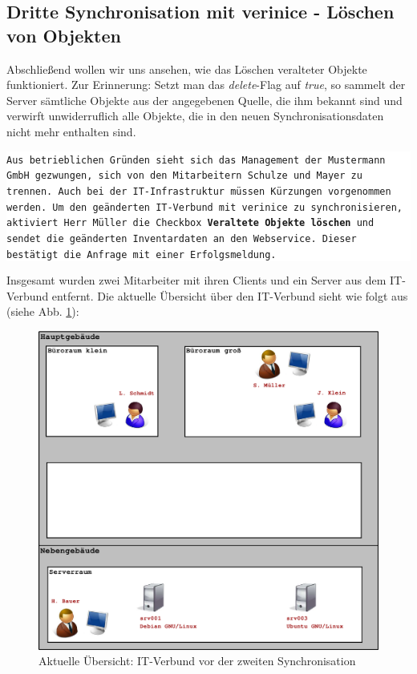 \documentclass[a4paper,10pt]{book}
\begin{document}
\subsection{ Dritte Synchronisation mit verinice - Löschen von Objekten}
Abschließend wollen wir uns ansehen, wie das Löschen veralteter Objekte funktioniert. Zur Erinnerung: Setzt man das
\textit{delete}-Flag auf \textit{true}, so sammelt der Server sämtliche Objekte aus der angegebenen Quelle, die ihm
bekannt sind und verwirft unwiderruflich alle Objekte, die in den neuen Synchronisationsdaten nicht mehr enthalten sind.
\newline
\newline
\colorbox{white}{\parbox{\textwidth}{
{\tt Aus betrieblichen Gründen sieht sich das Management der Mustermann GmbH gezwungen, sich von den Mitarbeitern Schulze und Mayer zu trennen.
Auch bei der IT-Infrastruktur müssen Kürzungen vorgenommen werden.
\newline\newline
Um den geänderten IT-Verbund mit verinice zu synchronisieren, aktiviert Herr Müller die Checkbox \textbf{Veraltete Objekte löschen} und sendet die geänderten Inventardaten an den Webservice. Dieser bestätigt die Anfrage mit einer Erfolgsmeldung.}
}}\newline\newline
Insgesamt wurden zwei Mitarbeiter mit ihren Clients und ein Server aus dem IT-Verbund entfernt. Die aktuelle Übersicht über den IT-Verbund sieht wie folgt aus (siehe Abb. \ref{fig:it-verbund-vor-der-zweiten-synchronisation-2}):
\newline
\begin{figure}[htb!]
  \centering
  \includegraphics[scale=.26]{Screenshot/Mustermann_snapshot03_03.png}
  \caption{Aktuelle Übersicht: IT-Verbund vor der zweiten Synchronisation}
  \label{fig:it-verbund-vor-der-zweiten-synchronisation-2}
\end{figure}
\end{document}
